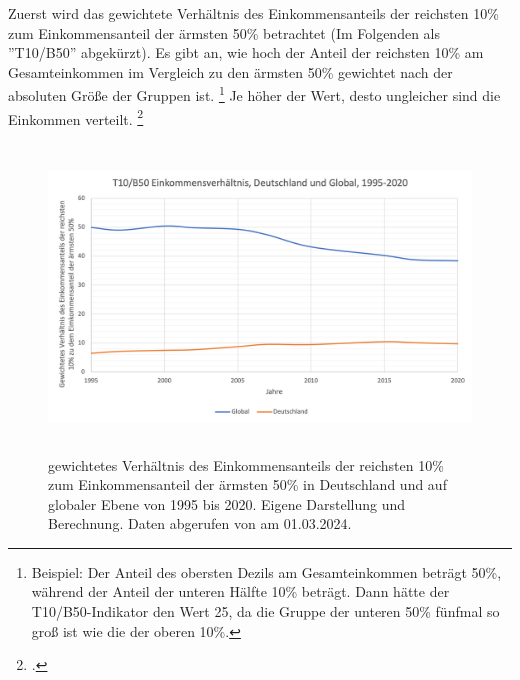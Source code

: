 Zuerst wird das gewichtete Verhältnis des Einkommensanteils der reichsten 10\% zum Einkommensanteil der ärmsten 50\% betrachtet (Im Folgenden als ''T10/B50'' abgekürzt). Es gibt an, wie hoch der Anteil der reichsten 10\% am Gesamteinkommen im Vergleich zu den ärmsten 50\% gewichtet nach der absoluten Grö{\ss}e der Gruppen ist. \footnote{Beispiel: Der Anteil des obersten Dezils am Gesamteinkommen beträgt 50\%, während der Anteil der unteren Hälfte 10\% beträgt. Dann hätte der T10/B50-Indikator den Wert 25, da die Gruppe der unteren 50\% fünfmal so gro{\ss} ist wie die der oberen 10\%.} Je höher der Wert, desto ungleicher sind die Einkommen verteilt. \footcite[Vgl.][S. 31]{wir_2022} 

\begin{figure}[h]
    \centering
    \includegraphics[height=8.15cm]{Bilder/T10B50-Ratio3.png}
    \caption[T10/B50 Einkommensverhältnis, Deutschland und global, 1995-2020]{gewichtetes Verhältnis des Einkommensanteils der reichsten 10\% zum Einkommensanteil der ärmsten 50\% in Deutschland und auf globaler Ebene von 1995 bis 2020. Eigene Darstellung und Berechnung. Daten abgerufen von \cite[][, S.55, 195]{wir_2022} am 01.03.2024.}
    \label{fig:iso_norm}
\end{figure}

